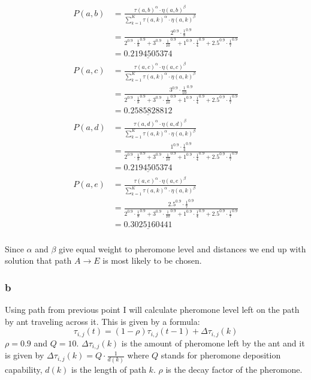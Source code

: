 \documentclass[a4,12pt]{extarticle}
\newcommand{\mysubsubsection}[2]{ 
\setcounter{subsubsection}{#1}
\subsubsection*{#2}
\addcontentsline{toc}{subsubsection}{#2}
}
\begin{document}
\begin{align*}
P(a,b) &= \frac{\tau(a,b)^\alpha \cdot \eta(a,b)^\beta} {\sum_{k=1}^{K} \tau(a,k)^\alpha \cdot \eta(a,k)^\beta}\\
&= \frac{2^{0.9} \cdot \frac{1}{8}^{0.9}}{2^{0.9} \cdot \frac{1}{8}^{0.9}+3^{0.9} \cdot \frac{1}{10}^{0.9} + 1^{0.9} \cdot \frac{1}{4}^{0.9}+2.5^{0.9} \cdot \frac{1}{7}^{0.9}}\\
&= \underline{0.2194505374}\\
P(a,c) &= \frac{\tau(a,c)^\alpha \cdot \eta(a,c)^\beta} {\sum_{k=1}^{K} \tau(a,k)^\alpha \cdot \eta(a,k)^\beta}\\
&= \frac{3^{0.9} \cdot \frac{1}{10}^{0.9}}{2^{0.9} \cdot \frac{1}{8}^{0.9}+3^{0.9} \cdot \frac{1}{10}^{0.9} + 1^{0.9} \cdot \frac{1}{4}^{0.9}+2.5^{0.9} \cdot \frac{1}{7}^{0.9}}\\
&= \underline{0.2585828812}\\
P(a,d) &= \frac{\tau(a,d)^\alpha \cdot \eta(a,d)^\beta} {\sum_{k=1}^{K} \tau(a,k)^\alpha \cdot \eta(a,k)^\beta}\\
&= \frac{1^{0.9} \cdot \frac{1}{4}^{0.9}}{2^{0.9} \cdot \frac{1}{8}^{0.9}+3^{0.9} \cdot \frac{1}{10}^{0.9} + 1^{0.9} \cdot \frac{1}{4}^{0.9}+2.5^{0.9} \cdot \frac{1}{7}^{0.9}}\\
&= \underline{0.2194505374}\\
P(a,e) &= \frac{\tau(a,e)^\alpha \cdot \eta(a,e)^\beta} {\sum_{k=1}^{K} \tau(a,k)^\alpha \cdot \eta(a,k)^\beta}\\
&= \frac{2.5^{0.9} \cdot \frac{1}{7}^{0.9}}{2^{0.9} \cdot \frac{1}{8}^{0.9}+3^{0.9} \cdot \frac{1}{10}^{0.9} + 1^{0.9} \cdot \frac{1}{4}^{0.9}+2.5^{0.9} \cdot \frac{1}{7}^{0.9}}\\
&= \underline{0.3025160441}\\
\end{align*}

Since $\alpha$ and $\beta$ give equal weight to pheromone level and distances we end up with solution that path $A \rightarrow E$ is most likely to be chosen.

\mysubsubsection{2}{b}
Using path from previous point I will calculate pheromone level left on the path by ant traveling across it. This is given by a formula: $$\tau_{i,j}(t)=(1-\rho)\tau_{i,j}(t-1) + \Delta \tau_{i,j}(k)$$ $\rho= 0.9$ and $Q=10$. $\Delta \tau_{i,j}(k)$ is the amount of pheromone left by the ant and it is given by $\Delta \tau_{i,j}(k)= Q \cdot \frac{1}{d(k)}$ where $Q$ stands for pheromone deposition capability, $d(k)$ is the length of path $k$. $\rho$ is the decay factor of the pheromone.
\end{document}
